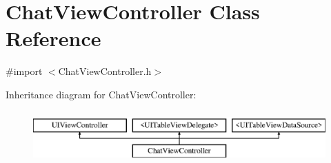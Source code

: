 \hypertarget{interface_chat_view_controller}{\section{Chat\+View\+Controller Class Reference}
\label{interface_chat_view_controller}
}


{\ttfamily \#import $<$Chat\+View\+Controller.\+h$>$}

Inheritance diagram for Chat\+View\+Controller\+:\begin{figure}[H]
\begin{center}
\leavevmode
\includegraphics[height=2.000000cm]{interface_chat_view_controller}
\end{center}
\end{figure}
